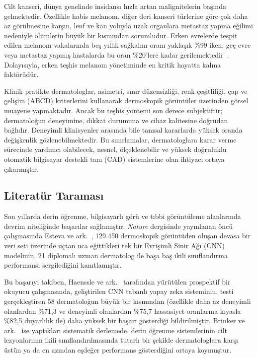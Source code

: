 \documentclass[12pt,a4paper]{article}
\begin{document}
Cilt kanseri, dünya genelinde insidansı hızla artan malignitelerin başında gelmektedir. Özellikle habis melanom, diğer deri kanseri türlerine göre çok daha az görülmesine karşın, lenf ve kan yoluyla uzak organlara metastaz yapma eğilimi nedeniyle ölümlerin büyük bir kısmından sorumludur. Erken evrelerde tespit edilen melanom vakalarında beş yıllık sağkalım oranı yaklaşık \%99 iken, geç evre veya metastaz yapmış hastalarda bu oran \%20'lere kadar gerilemektedir~\cite{esteva2017}. Dolayısıyla, erken teşhis melanom yönetiminde en kritik hayatta kalma faktörüdür.

Klinik pratikte dermatologlar, asimetri, sınır düzensizliği, renk çeşitliliği, çap ve gelişim (ABCD) kriterlerini kullanarak dermoskopik görüntüler üzerinden görsel muayene yapmaktadır. Ancak bu teşhis yöntemi son derece subjektiftir; dermatoloğun deneyimine, dikkat durumuna ve cihaz kalitesine doğrudan bağlıdır. Deneyimli klinisyenler arasında bile tanısal kararlarda yüksek oranda değişkenlik gözlenebilmektedir. Bu sınırlamalar, dermatologlara karar verme sürecinde yardımcı olabilecek, nesnel, ölçeklenebilir ve yüksek doğruluklu otomatik bilgisayar destekli tanı (CAD) sistemlerine olan ihtiyacı ortaya çıkarmıştır.

\subsection{Literatür Taraması}
\label{subsec:literatur}

Son yıllarda derin öğrenme, bilgisayarlı görü ve tıbbi görüntüleme alanlarında devrim niteliğinde başarılar sağlamıştır. \textit{Nature} dergisinde yayınlanan öncü çalışmasında Esteva ve ark.~\cite{esteva2017}, 129.450 dermoskopik görüntüden oluşan devasa bir veri seti üzerinde uçtan uca eğittikleri tek bir Evrişimli Sinir Ağı (CNN) modelinin, 21 diplomalı uzman dermatolog ile başa baş ikili sınıflandırma performansı sergilediğini kanıtlamıştır.

Bu başarıyı takiben, Haenssle ve ark.~\cite{haenssle2018} tarafından yürütülen prospektif bir okuyucu çalışmasında, geliştirilen CNN tabanlı yapay zeka sisteminin, testi gerçekleştiren 58 dermatoloğun büyük bir kısmından (özellikle daha az deneyimli olanlardan \%71,3 ve deneyimli olanlardan \%75,7 hassasiyet oranlarına kıyasla \%82,5 duyarlılık ile) daha yüksek bir başarı gösterdiği bildirilmiştir. Brinker ve ark.~\cite{brinker2019} ise yaptıkları sistematik derlemede, derin öğrenme sistemlerinin cilt lezyonlarının ikili sınıflandırılmasında tutarlı bir şekilde dermatologlara karşı üstün ya da en azından eşdeğer performans gösterdiğini ortaya koymuştur.
\end{document}
